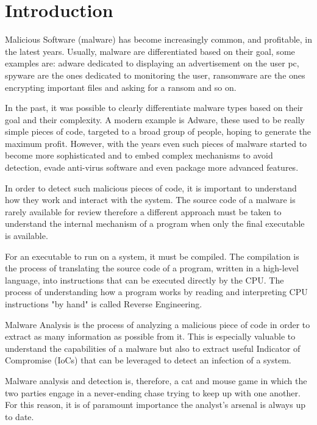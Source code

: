 \chapter{Introduction}

Malicious Software (malware) has become increasingly common, and profitable, in the latest years. Usually, malware are differentiated based on their goal, some examples are: adware dedicated to displaying an advertisement on the user pc, spyware are the ones dedicated to monitoring the user, ransomware are the ones encrypting important files and asking for a ransom and so on. 

In the past, it was possible to clearly differentiate malware types based on their goal and their complexity. A modern example is Adware, these used to be really simple pieces of code, targeted to a broad group of people, hoping to generate the maximum profit. However, with the years even such pieces of malware started to become more sophisticated and to embed complex mechanisms to avoid detection, evade anti-virus software and even package more advanced features\cite{bitdef}.

In order to detect such malicious pieces of code, it is important to understand how they work and interact with the system. The source code of a malware is rarely available for review therefore a different approach must be taken to understand the internal mechanism of a program when only the final executable is available. 

For an executable to run on a system, it must be compiled. The compilation is the process of translating the source code of a program, written in a high-level language, into instructions that can be executed directly by the CPU. The process of understanding how a program works by reading and interpreting CPU instructions "by hand" is called Reverse Engineering.

Malware Analysis is the process of analyzing a malicious piece of code in order to extract as many information as possible from it. This is especially valuable to understand the capabilities of a malware but also to extract useful Indicator of Compromise (IoCs) that can be leveraged to detect an infection of a system. 

Malware analysis and detection is, therefore, a cat and mouse game in which the two parties engage in a never-ending chase trying to keep up with one another. For this reason, it is of paramount importance the analyst's arsenal is always up to date.

